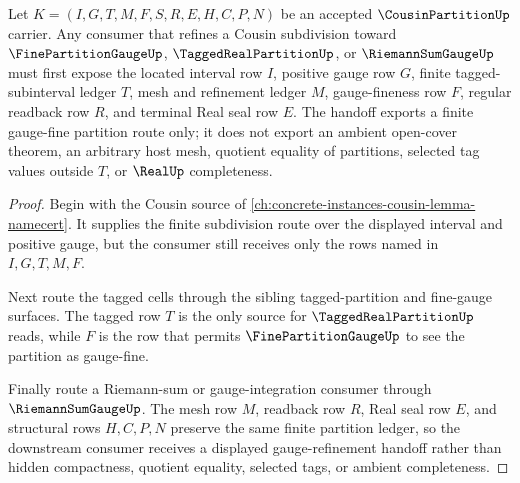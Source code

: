 \begin{theorem}
\label{thm:cousin-partition-gauge-refinement-handoff}
Let $K=(I,G,T,M,F,S,R,E,H,C,P,N)$ be an accepted $\CousinPartitionUp$ carrier. Any consumer that refines a Cousin subdivision toward $\FinePartitionGaugeUp$, $\TaggedRealPartitionUp$, or $\RiemannSumGaugeUp$ must first expose the located interval row $I$, positive gauge row $G$, finite tagged-subinterval ledger $T$, mesh and refinement ledger $M$, gauge-fineness row $F$, regular readback row $R$, and terminal Real seal row $E$. The handoff exports a finite gauge-fine partition route only; it does not export an ambient open-cover theorem, an arbitrary host mesh, quotient equality of partitions, selected tag values outside $T$, or $\RealUp$ completeness.
\end{theorem}
\begin{proof}
Begin with the Cousin source of \autoref{ch:concrete-instances-cousin-lemma-namecert}. It supplies the finite subdivision route over the displayed interval and positive gauge, but the consumer still receives only the rows named in $I,G,T,M,F$.

Next route the tagged cells through the sibling tagged-partition and fine-gauge surfaces. The tagged row $T$ is the only source for $\TaggedRealPartitionUp$ reads, while $F$ is the row that permits $\FinePartitionGaugeUp$ to see the partition as gauge-fine.

Finally route a Riemann-sum or gauge-integration consumer through $\RiemannSumGaugeUp$. The mesh row $M$, readback row $R$, Real seal row $E$, and structural rows $H,C,P,N$ preserve the same finite partition ledger, so the downstream consumer receives a displayed gauge-refinement handoff rather than hidden compactness, quotient equality, selected tags, or ambient completeness.
\end{proof}


